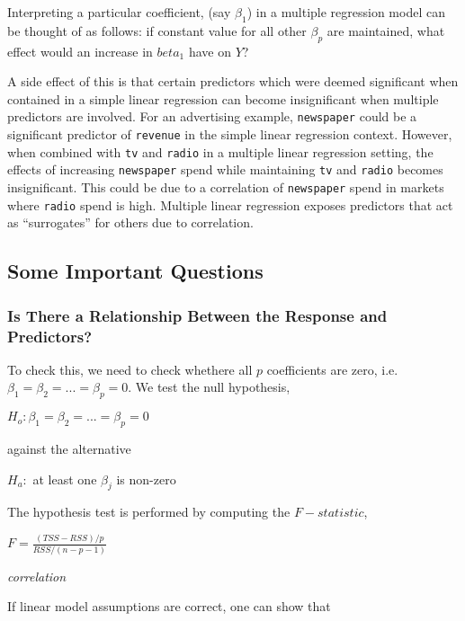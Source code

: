 \documentclass[]{book}
\begin{document}
Interpreting a particular coefficient, (say \(\beta_1\)) in a multiple regression model can be thought of as follows: if constant value for all other \(\beta_p\) are maintained, what effect would an increase in \(beta_1\) have on \(Y\)?

A side effect of this is that certain predictors which were deemed significant when contained in a simple linear regression can become insignificant when multiple predictors are involved. For an advertising example, \texttt{newspaper} could be a significant predictor of \texttt{revenue} in the simple linear regression context. However, when combined with \texttt{tv} and \texttt{radio} in a multiple linear regression setting, the effects of increasing \texttt{newspaper} spend while maintaining \texttt{tv} and \texttt{radio} becomes insignificant. This could be due to a correlation of \texttt{newspaper} spend in markets where \texttt{radio} spend is high. Multiple linear regression exposes predictors that act as ``surrogates'' for others due to correlation.

\hypertarget{some-important-questions}{%
\subsection{Some Important Questions}\label{some-important-questions}}

\hypertarget{is-there-a-relationship-between-the-response-and-predictors}{%
\subsubsection{Is There a Relationship Between the Response and Predictors?}\label{is-there-a-relationship-between-the-response-and-predictors}}

To check this, we need to check whethere all \(p\) coefficients are zero, i.e. \(\beta_1 = \beta_2 = ... = \beta_p = 0\). We test the null hypothesis,

\(H_o:\beta_1 = \beta_2 = ... = \beta_p = 0\)

against the alternative

\(H_a:\) at least one \(\beta_j\) is non-zero

The hypothesis test is performed by computing the \(F-statistic\),

\(F = \frac{(TSS-RSS)/p}{RSS/(n-p-1)}\)

\emph{correlation}

If linear model assumptions are correct, one can show that
\end{document}
